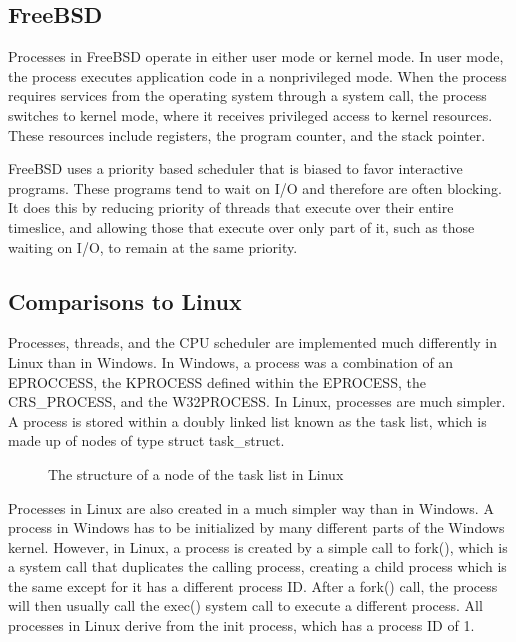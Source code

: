 \documentclass[journal,letterpaper,draftclsnofoot,onecolumn,10pt]{IEEEtran}
\begin{document}
\subsection{FreeBSD}

Processes in FreeBSD operate in either user mode or kernel mode. In user mode, the process executes application code in a nonprivileged mode. When the process requires services from the operating system through a system call, the process switches to kernel mode, where it receives privileged access to kernel resources. These resources include registers, the program counter, and the stack pointer.

FreeBSD uses a priority based scheduler that is biased to favor interactive programs. These programs tend to wait on I/O and therefore are often blocking. It does this by reducing priority of threads that execute over their entire timeslice, and allowing those that execute over only part of it, such as those waiting on I/O, to remain at the same priority.\cite{mn15}

\subsection{Comparisons to Linux}

Processes, threads, and the CPU scheduler are implemented much differently in Linux than in Windows. In Windows, a process was a combination of an EPROCCESS, the KPROCESS defined within the EPROCESS, the CRS\_PROCESS, and the W32PROCESS. In Linux, processes are much simpler. A process is stored within a doubly linked list known as the task list, which is made up of nodes of type struct task\_struct.\cite{l05}

\begin{figure}[h]

\caption{The structure of a node of the task list in Linux}
\end{figure}

Processes in Linux are also created in a much simpler way than in Windows. A process in Windows has to be initialized by many different parts of the Windows kernel. However, in Linux, a process is created by a simple call to fork(), which is a system call that duplicates the calling process, creating a child process which is the same except for it has a different process ID. After a fork() call, the process will then usually call the exec() system call to execute a different process. All processes in Linux derive from the init process, which has a process ID of 1.\cite{l05}
\end{document}
